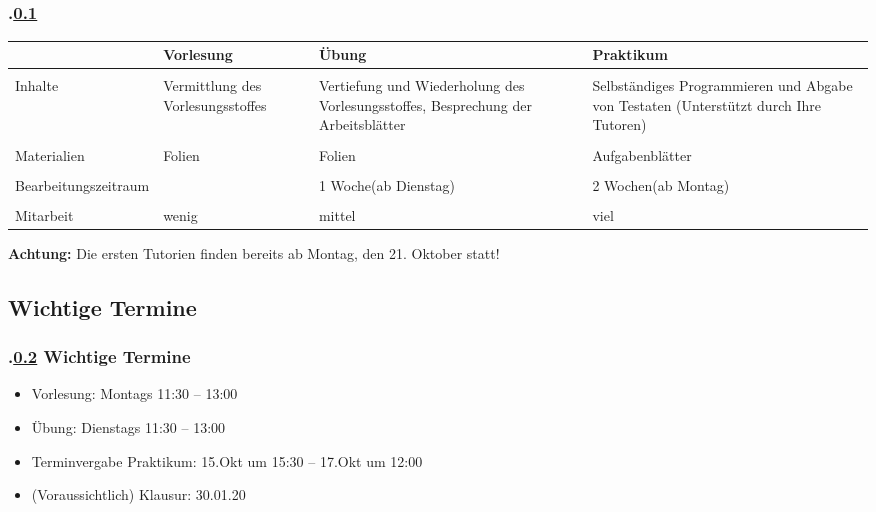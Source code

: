 \subsection{\stitle}\label{S:Einordnung}
\begin{frame}[fragile]%
  \frametitle{\kap.\ref{S:Einordnung} \stitle}%

  \begin{tabular}{p{2cm}|p{2.0cm}|p{2.7cm}|p{3.0cm}}
  & {\centering Vorlesung} & {\centering Übung} & {\centering Praktikum}\\
  \hline
  \hline & & &  \\
  Inhalte & Vermittlung des Vorlesungs\-stoffes & Vertiefung und Wiederholung des Vorlesungsstoffes, Besprechung der Arbeitsblätter & Selbständiges Programmieren und Abgabe von Testaten (Unterstützt durch Ihre Tutoren)\\
  \hline & & & \\
  Materialien & Folien & Folien & Aufgabenblätter\\
  \hline & & & \\
  Be\-ar\-bei\-tungs\-zeit\-raum & & 1 Woche\newline (ab Dienstag) & 2 Wochen\newline  (ab Montag)\\
  \hline & & & \\
  Mitarbeit & wenig & mittel & viel
  \end{tabular}
  \vfill

  \textbf{Achtung:} Die ersten Tutorien finden bereits ab Montag, den 21. Oktober statt!
\end{frame}


\def\stitle{Wichtige Termine}%
\subsection{\stitle}\label{S:Termine}
\begin{frame}[fragile]%
  \frametitle{\kap.\ref{S:Termine} \stitle}%

\begin{itemize}
  \item Vorlesung: Montags 11:30 -- 13:00
  \item Übung: Dienstags 11:30 -- 13:00
  \item Terminvergabe Praktikum: 15.Okt um 15:30 -- 17.Okt um 12:00
  \item (Voraussichtlich) Klausur: 30.01.20
\end{itemize}
\end{frame}
